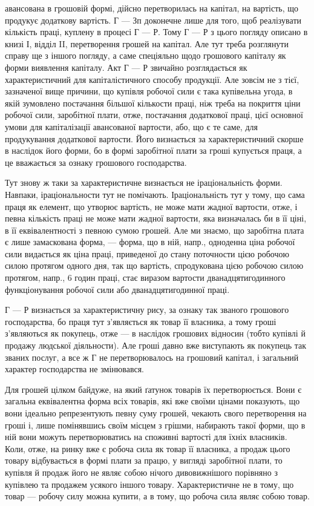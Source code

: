 \parcont{}  %
авансована в грошовій формі, дійсно перетворилась на капітал, на вартість,
що продукує додаткову вартість. Г — Зп доконечне лише для того,
щоб реалізувати кількість праці, куплену в процесі Г — Р. Тому Г — Р
з цього погляду описано в книзі І, відділ II, перетворення грошей
на капітал. Але тут треба розглянути справу ще з іншого погляду,
а саме спеціяльно щодо грошового капіталу як форми виявлення капіталу.
Акт Г — Р звичайно розглядається як характеристичний для капіталістичного
способу продукції. Але зовсім не з тієї, зазначеної вище причини,
що купівля робочої сили є така купівельна угода, в якій зумовлено
постачання більшої кількости праці, ніж треба на покриття ціни робочої
сили, заробітної плати, отже, постачання додаткової праці, цієї основної
умови для капіталізації авансованої вартости, або, що є те саме, для
продукування додаткової вартости. Його визнається за характеристичний
скорше в наслідок його форми, бо в формі заробітної плати за гроші
купується праця, а це вважається за ознаку грошового господарства.

Тут знову ж таки за характеристичне визнається не іраціональність
форми. Навпаки, іраціональности тут не помічають. Іраціональність тут у
тому, що сама праця як елемент, що утворює вартість, не може мати
жадної вартости, отже, і певна кількість праці не може мати жадної
вартости, яка визначалась би в її ціні, в її еквівалентності з певною
сумою грошей. Але ми знаємо, що заробітна плата є лише замаскована
форма, — форма, що в ній, напр., одноденна ціна робочої сили видається
як ціна праці, приведеної до стану поточности цією робочою силою протягом
одного дня, так що вартість, спродукована цією робочою силою
протягом, напр., 6 годин праці, стає виразом вартости дванадцятигодинного
функціонування робочої сили або дванадцятигодинної праці.

Г — Р визнається за характеристичну рису, за ознаку так званого грошового
господарства, бо праця тут з’являється як товар її власника, а тому
гроші з’являються як покупець, отже — в наслідок грошових відносин
(тобто купівлі й продажу людської діяльности). Але гроші давно вже
виступають як покупець так званих послуг, а все ж Г не перетворювалось
на грошовий капітал, і загальний характер господарства не
змінювався.

Для грошей цілком байдуже, на який ґатунок товарів їх перетворюється.
Вони є загальна еквівалентна форма всіх товарів, які вже
своїми цінами показують, що вони ідеально репрезентують певну суму грошей,
чекають свого перетворення на гроші і, лише помінявшись своїм місцем
з грішми, набирають такої форми, що в ній вони можуть перетворюватись на
споживні вартості для їхніх власників. Коли, отже, на ринку вже є робоча
сила як товар її власника, а продаж цього товару відбувається в формі
плати за працю, у вигляді заробітної плати, то купівля й продаж його
не являє собою нічого дивовижнішого порівняно з купівлею та
продажем усякого іншого товару. Характеристичне не в тому, що товар
— робочу силу можна купити, а в тому, що робоча сила являє собою
товар.
